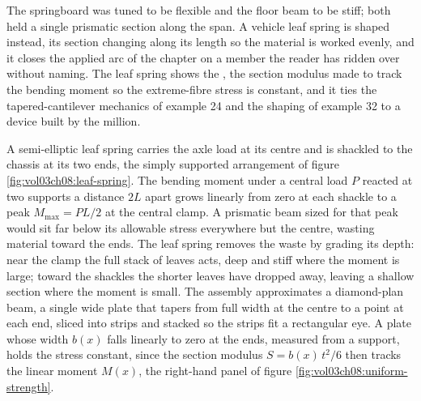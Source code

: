 The springboard was tuned to be flexible and the floor beam to be stiff;
both held a single prismatic section along the span. A vehicle leaf spring
is shaped instead, its section changing along its length so the material is
worked evenly, and it closes the applied arc of the chapter on a member the
reader has ridden over without naming. The leaf spring shows the
, the section modulus made to track the
bending moment so the extreme-fibre stress is constant, and it ties the
tapered-cantilever mechanics of example 24 and the shaping of example 32 to
a device built by the million.

A semi-elliptic leaf spring carries the axle load at its centre and is
shackled to the chassis at its two ends, the simply supported arrangement
of figure \ref{fig:vol03ch08:leaf-spring}. The bending moment under a
central load $P$ reacted at two supports a distance $2L$ apart grows
linearly from zero at each shackle to a peak $M_{\max} = P L/2$ at the
central clamp. A prismatic beam sized for that peak would sit far below its
allowable stress everywhere but the centre, wasting material toward the
ends. The leaf spring removes the waste by grading its depth: near the
clamp the full stack of leaves acts, deep and stiff where the moment is
large; toward the shackles the shorter leaves have dropped away, leaving a
shallow section where the moment is small. The assembly approximates a
diamond-plan beam, a single wide plate that tapers from full width at the
centre to a point at each end, sliced into strips and stacked so the strips
fit a rectangular eye. A plate whose width $b(x)$ falls linearly to zero at
the ends, measured from a support, holds the stress constant, since the
section modulus $S = b(x)\,t^2/6$ then tracks the linear moment $M(x)$, the
right-hand panel of figure \ref{fig:vol03ch08:uniform-strength}.

